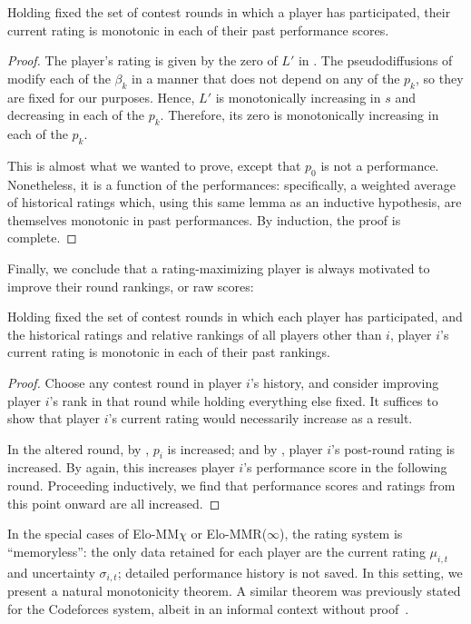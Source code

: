 \begin{lemma}
\label{lem:mono-rate}
Holding fixed the set of contest rounds in which a player has participated, their current rating is monotonic in each of their past performance scores.
\end{lemma}

\begin{proof}
The player's rating is given by the zero of $L'$ in . The pseudodiffusions of  modify each of the $\beta_k$ in a manner that does not depend on any of the $p_k$, so they are fixed for our purposes. Hence, $L'$ is monotonically increasing in $s$ and decreasing in each of the $p_k$. Therefore, its zero is monotonically increasing in each of the $p_k$.

This is almost what we wanted to prove, except that $p_0$ is not a performance. Nonetheless, it is a function of the performances: specifically, a weighted average of historical ratings which, using this same lemma as an inductive hypothesis, are themselves monotonic in past performances. By induction, the proof is complete.
\end{proof}

Finally, we conclude that a rating-maximizing player is always motivated to improve their round rankings, or raw scores:

\begin{theorem}
\label{thm:mono}
Holding fixed the set of contest rounds in which each player has participated, and the historical ratings and relative rankings of all players other than $i$, player $i$'s current rating is monotonic in each of their past rankings.
\end{theorem}

\begin{proof}
Choose any contest round in player $i$'s history, and consider improving player $i$'s rank in that round while holding everything else fixed. It suffices to show that player $i$'s current rating would necessarily increase as a result.

In the altered round, by , $p_i$ is increased; and by , player $i$'s post-round rating is increased. By  again, this increases player $i$'s performance score in the following round. Proceeding inductively, we find that performance scores and ratings from this point onward are all increased.
\end{proof}

In the special cases of Elo-MM$\chi$ or Elo-MMR($\infty$), the rating system is ``memoryless'': the only data retained for each player are the current rating $\mu_{i,t}$ and uncertainty $\sigma_{i,t}$; detailed performance history is not saved. In this setting, we present a natural monotonicity theorem. A similar theorem was previously stated for the Codeforces system, albeit in an informal context without proof~\cite{Codeforces}.

